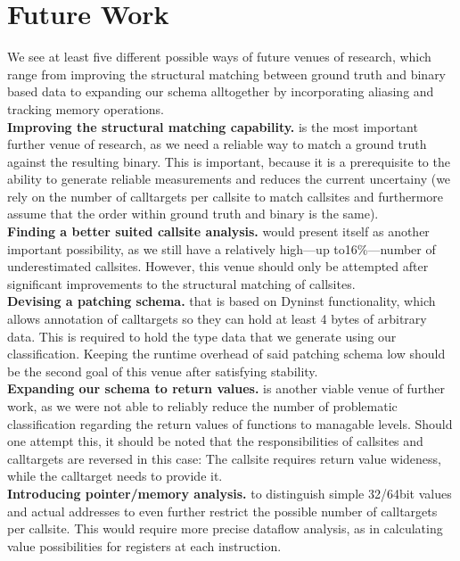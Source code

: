\section{Future Work}
\label{chapter:Future_Work}
We see at least five different possible ways of future venues of research, 
which range from improving the structural matching between ground 
truth and binary based data to expanding our schema alltogether 
by incorporating aliasing and tracking memory operations.\\

\textbf{Improving the structural matching capability.} is the most 
important further venue of research, as we need a reliable way to 
match a ground truth against the resulting binary. This is important, 
because it is a prerequisite to the ability to generate reliable 
measurements and reduces the current uncertainy (we rely on the 
number of calltargets per callsite to match callsites and furthermore
assume that the order within ground truth and binary is the same).\\

\textbf{Finding a better suited callsite analysis.} would present 
itself as another important possibility, as we still have a relatively 
high---up to16\%---number of underestimated callsites. 
However, this venue should only be attempted after significant 
improvements to the structural matching of callsites.\\

\textbf{Devising a patching schema.} that is based on Dyninst functionality, 
which allows annotation of calltargets so they can hold at least 
4 bytes of arbitrary data. This is required to hold the type data that
we generate using our classification. Keeping the runtime overhead
of said patching schema low should be the second goal of this venue 
after satisfying stability.\\

\textbf{Expanding our schema to return values.} is another viable venue
of further work, as we were not able to reliably reduce the number of 
problematic classification regarding the return values of functions to 
managable levels. Should one attempt this, it should be noted that the
responsibilities of callsites and calltargets are reversed in this 
case: The callsite requires return value wideness, while the calltarget
needs to provide it.\\

\textbf{Introducing pointer/memory analysis.} to distinguish simple 
32/64bit values and actual addresses to even further restrict the 
possible number of calltargets per callsite. This would require more 
precise dataflow analysis, as in calculating value possibilities for 
registers at each instruction.
